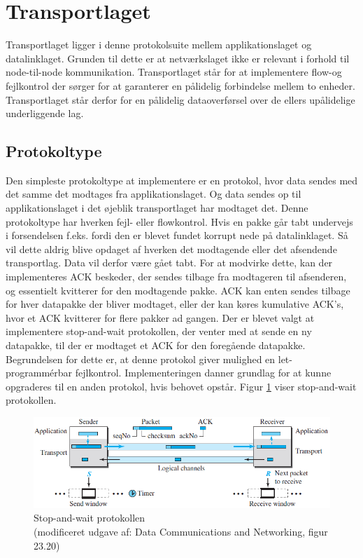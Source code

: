 \section{Transportlaget}
Transportlaget ligger i denne protokolsuite mellem applikationslaget og datalinklaget. Grunden til dette er at netværkslaget ikke er relevant i forhold til node-til-node kommunikation. Transportlaget står for at implementere flow-og fejlkontrol der sørger for at garanterer en pålidelig forbindelse mellem to enheder. Transportlaget står derfor for en pålidelig dataoverførsel over de ellers upålidelige underliggende lag.

\subsection{Protokoltype}
Den simpleste protokoltype at implementere er en protokol, hvor data sendes med det samme det modtages fra applikationslaget. Og data sendes op til applikationslaget i det øjeblik transportlaget har modtaget det. Denne protokoltype har hverken fejl- eller flowkontrol. Hvis en pakke går tabt undervejs i forsendelsen f.eks. fordi den er blevet fundet korrupt nede på datalinklaget. Så vil dette aldrig blive opdaget af hverken det modtagende eller det afsendende transportlag. Data vil derfor være gået tabt. For at modvirke dette, kan der implementeres ACK beskeder, der sendes tilbage fra modtageren til afsenderen, og essentielt kvitterer for den modtagende pakke. ACK kan enten sendes tilbage for hver datapakke der bliver modtaget, eller der kan køres kumulative ACK's, hvor et ACK kvitterer for flere pakker ad gangen. Der er blevet valgt at implementere stop-and-wait protokollen, der venter med at sende en ny datapakke, til der er modtaget et ACK for den foregående datapakke. Begrundelsen for dette er, at denne protokol giver mulighed en let-programmérbar fejlkontrol. Implementeringen danner grundlag for at kunne opgraderes til en anden protokol, hvis behovet opstår. Figur \ref{StopAndWait} viser stop-and-wait protokollen.
\begin{figure}[h]
\centering
\includegraphics[scale=0.75]{Billeder/StopAndWait.png}
\caption{Stop-and-wait protokollen \\ (modificeret udgave af: Data Communications and Networking, figur 23.20)
\label{StopAndWait}}
\end{figure}

